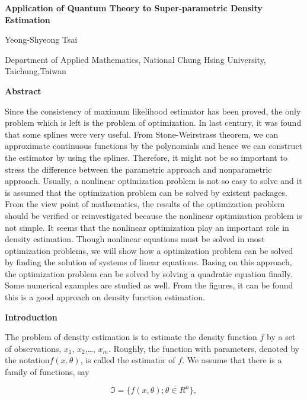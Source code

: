 \documentclass [18pt]{article}
\begin{document}
\textbf{Application of Quantum Theory to Super-parametric Density
Estimation}











Yeong-Shyeong Tsai

Department of Applied Mathematics, National Chung Hsing
University, Taichung,Taiwan





\textbf{Abstract}

Since the consistency of maximum likelihood estimator has been proved, the
only problem which is left is the problem of optimization. In last century,
it was found that some splines were very useful. From Stone-Weirstrass
theorem, we can approximate continuous functions by the polynomials and
hence we can construct the estimator by using the splines. Therefore, it
might not be so important to stress the difference between the parametric
approach and nonparametric approach. Usually, a nonlinear optimization
problem is not so easy to solve and it is assumed that the optimization
problem can be solved by existent packages. From the view point of
mathematics, the results of the optimization problem should be verified or
reinvestigated because the nonlinear optimization problem is not simple. It
seems that the nonlinear optimization play an important role in density
estimation. Though nonlinear equations must be solved in most optimization
problems, we will show how a optimization problem can be solved by finding
the solution of systems of linear equations. Basing on this approach, the
optimization problem can be solved by solving a quadratic equation finally.
Some numerical examples are studied as well. From the figures, it can be
found this is a good approach on density function estimation.

\textbf{Introduction}

The problem of density estimation is to estimate the density function $f$ by
a set of observations, $x_1 $, $x_2 $,\ldots , $x_m $. Roughly, the function
with parameters, denoted by the notation$f(x,\theta )$, is called the
estimator of $f$. We assume that there is a family of functions, say


\begin{equation}
\label{eq1}
\Im = \{f(x,\theta );\theta \in R^n\},
\end{equation}
\end{document}
